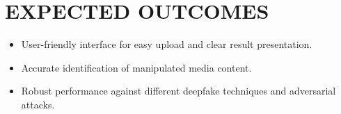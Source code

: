 \section{EXPECTED OUTCOMES}
\begin{itemize}
    \item User-friendly interface for easy upload and clear result presentation.
    \item Accurate identification of manipulated media content.
    \item Robust performance against different deepfake techniques and adversarial attacks.
\end{itemize}